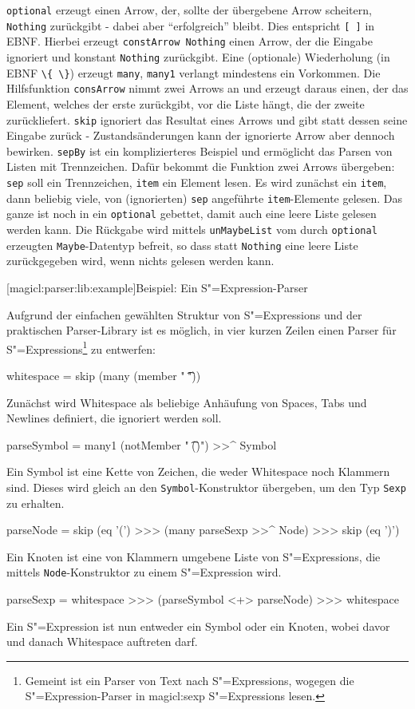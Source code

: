 \documentclass[a4paper, bibgerm]{book}
\newcommand\icode[1]{\lstinline?#1?}
\newcommand\lsubsubsection{}
\newcommand\sref{}
\newcommand{\sexp}{S"=Expression}
\newcommand{\sexps}{S"=Expressions}
\begin{document}
\icode{optional} erzeugt einen Arrow, der, sollte der übergebene Arrow
scheitern, \icode{Nothing} zurückgibt - dabei aber "`erfolgreich"'
bleibt. Dies entspricht \icode{[ ]} in EBNF. Hierbei erzeugt
\icode{constArrow Nothing} einen Arrow, der die Eingabe ignoriert und
konstant \icode{Nothing} zurückgibt. Eine (optionale) Wiederholung (in EBNF
\icode{\{ \}}) erzeugt \icode{many}, \icode{many1} verlangt mindestens
ein Vorkommen. Die Hilfsfunktion \icode{consArrow} nimmt zwei
Arrows an und erzeugt daraus einen, der das Element, welches der erste
zurückgibt, vor die Liste hängt, die der zweite zurückliefert.
\icode{skip} ignoriert das Resultat eines Arrows und gibt
statt dessen seine Eingabe zurück - Zustandsänderungen kann der
ignorierte Arrow aber dennoch bewirken. \icode{sepBy} ist ein
komplizierteres Beispiel und ermöglicht das Parsen von Listen mit
Trennzeichen. Dafür bekommt die Funktion zwei Arrows übergeben:
\icode{sep} soll ein Trennzeichen, \icode{item} ein Element lesen. Es
wird zunächst ein \icode{item}, dann beliebig viele, von (ignorierten)
\icode{sep} angeführte \icode{item}-Elemente gelesen. Das ganze ist noch
in ein \icode{optional} gebettet, damit auch eine leere Liste gelesen
werden kann. Die Rückgabe wird mittels \icode{unMaybeList} vom durch
\icode{optional} erzeugten \icode{Maybe}-Datentyp befreit, so dass statt
\icode{Nothing} eine leere Liste zurückgegeben wird, wenn nichts gelesen
werden kann.

\lsubsubsection[magicl:parser:lib:example]{Beispiel: Ein \sexp{}-Parser}

Aufgrund der einfachen gewählten Struktur von \sexps{} und der
praktischen Parser-Library ist es möglich, in vier kurzen Zeilen einen
Parser für \sexps{}\footnote{Gemeint ist ein Parser von Text nach
  \sexps{}, wogegen die \sexp{}-Parser in \sref{magicl:sexp} \sexps{}
  lesen.} zu entwerfen:

\begin{code}
whitespace = skip (many (member " \t\n"))
\end{code}
Zunächst wird Whitespace als beliebige Anhäufung von Spaces, Tabs und
Newlines definiert, die ignoriert werden soll.
\begin{code}
parseSymbol = many1 (notMember " \t\n()") >>^ Symbol
\end{code} %
Ein Symbol ist eine Kette von Zeichen, die weder Whitespace noch
Klammern sind. Dieses wird gleich an den \icode{Symbol}-Konstruktor
übergeben, um den Typ \icode{Sexp} zu erhalten.
\begin{code}
parseNode = skip (eq '(') >>> (many parseSexp >>^ Node) >>> skip (eq ')')
\end{code} %
Ein Knoten ist eine von Klammern umgebene Liste von \sexps{}, die
mittels \icode{Node}-Konstruktor zu einem \sexp{} wird.
\begin{code}
parseSexp = whitespace >>> (parseSymbol <+> parseNode) >>> whitespace
\end{code} %
Ein \sexp{} ist nun entweder ein Symbol oder ein Knoten, wobei davor und
danach Whitespace auftreten darf.
\end{document}
